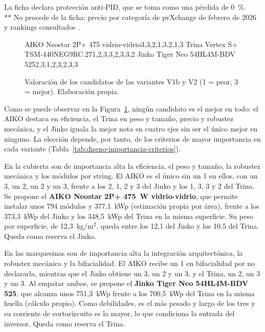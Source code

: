 \begin{table}[htbp]
    \smallskip
    {\scriptsize * La ficha declara protección anti-PID, que se toma como una pérdida de 0~\%.\\ ** No procede de la ficha: precio por categoría de pvXchange de febrero de 2026 \cite{PvXchangePrecios2026} y rankings consultados \cite{CleanEnergyReviews2025,BlackRidge2025}.}
\end{table}

\begin{figure}[htbp]
    \centering
        {AIKO Neostar 2P+ 475 vidrio-vidrio}{3,3,2,1,3,2,1,3}
        {Trina Vertex S+ TSM-440NEG9RC.27}{1,2,3,3,2,3,3,2}
        {Jinko Tiger Neo 54HL4M-BDV 525}{2,3,1,2,3,2,3,3}
    \caption{Valoración de los candidatos de las variantes V1b y V2 (1 = peor, 3 = mejor). Elaboración propia.}
    \label{fig:radar-v1b-v2}
\end{figure}

Como se puede observar en la Figura~\ref{fig:radar-v1b-v2}, ningún candidato es el mejor en todo: el AIKO destaca en eficiencia, el Trina en peso y tamaño, precio y robustez mecánica, y el Jinko iguala la mejor nota en cuatro ejes sin ser el único mejor en ninguno. La elección depende, por tanto, de los criterios de mayor importancia en cada variante (Tabla~\ref{tab:diseno-importancia-criterios}).

En la cubierta son de importancia alta la eficiencia, el peso y tamaño, la robustez mecánica y los módulos por string. El AIKO es el único sin un 1 en ellos, con un 3, un 2, un 2 y un 3, frente a los 2, 1, 2 y 3 del Jinko y los 1, 3, 3 y 2 del Trina. Se propone el \textbf{AIKO Neostar 2P+ 475~W vidrio-vidrio}, que permite instalar unos 794 módulos y 377,1~kWp (estimación propia por área), frente a los 373,3~kWp del Jinko y los 348,5~kWp del Trina en la misma superficie. Su peso por superficie, de 12,3~kg/m$^2$, queda entre los 12,1 del Jinko y los 10,5 del Trina. Queda como reserva el Jinko.

En las marquesinas son de importancia alta la integración arquitectónica, la robustez mecánica y la bifacialidad. El AIKO recibe un 1 en bifacialidad por no declararla, mientras que el Jinko obtiene un 3, un 2 y un 3, y el Trina, un 2, un 3 y un 3. Al empatar ambos, se propone el \textbf{Jinko Tiger Neo 54HL4M-BDV 525}, que alcanza unos 751,3~kWp frente a los 700,5~kWp del Trina en la misma huella (cálculo propio). Como debilidades, es el más pesado y largo de los tres y su corriente de cortocircuito es la mayor, lo que condiciona la entrada del inversor. Queda como reserva el Trina.

